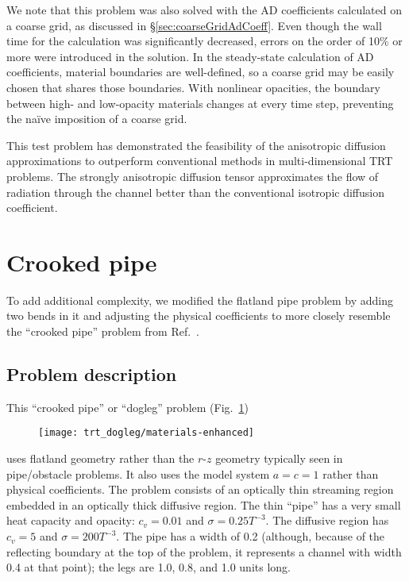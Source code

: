 We note that this problem was also solved with the AD coefficients calculated on
a coarse grid, as discussed in \S\ref{sec:coarseGridAdCoeff}. Even though the
wall time for the calculation was significantly decreased, errors on the order
of 10\% or more were introduced in the solution. In the steady-state calculation
of AD coefficients, material boundaries are well-defined, so a coarse grid may
be easily chosen that shares those boundaries. With nonlinear opacities, the
boundary between high- and low-opacity materials changes at every time step,
preventing the na\"ive imposition of a coarse grid.

This test problem has demonstrated the feasibility of the anisotropic diffusion
approximations to outperform conventional methods in multi-dimensional
TRT problems. The strongly anisotropic diffusion tensor approximates the flow of
radiation through the channel better than the conventional isotropic diffusion
coefficient.

\clearpage
\section{Crooked pipe}

To add additional complexity, we modified the flatland pipe problem by adding
two bends in it and adjusting the physical coefficients to more closely resemble
the ``crooked pipe'' problem from Ref.~\cite{Gen2001}.

\subsection{Problem description}

This ``crooked pipe'' or ``dogleg'' problem (Fig.~\ref{fig:doglegMaterials})
%
\begin{figure}[htb]
  \centering
  \texttt{[image: trt\_dogleg/materials-enhanced]}
  \label{fig:doglegMaterials}
\end{figure}
%
uses flatland geometry rather than the $r$-$z$ geometry typically seen in
pipe/obstacle problems. It also uses the model system $a=c=1$ rather than
physical coefficients. The problem consists of an optically thin
streaming region embedded in an optically thick diffusive region. The thin
``pipe'' has a very small heat capacity and opacity: $c_v=0.01$ and
$\sigma=0.25T^{-3}$. The diffusive region has $c_v=5$ and $\sigma=200 T^{-3}$.
The pipe has a width of 0.2 (although, because of the reflecting boundary at
the top of the problem, it represents a channel with width 0.4 at that point);
the legs are 1.0, 0.8, and 1.0 units long.

